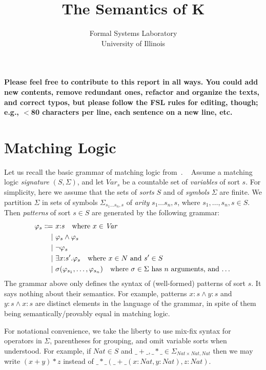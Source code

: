 \documentclass[UTF8]{article}
\title{The Semantics of K}
\author{Formal Systems Laboratory \\
          University of Illinois}
\newcommand{\comment}[1]
    {\par {\bfseries \color{blue} #1 \par}} %
\theoremstyle{plain}
\theoremstyle{definition}
\theoremstyle{remark}
\newcommand{\cln}{{:}}
\begin{document}
\maketitle

\comment{Please feel free to contribute to this report in all ways.
You could add new contents, remove redundant ones, refactor and
organize the texts, and correct typos, but please follow the FSL rules for editing, though; e.g., $<$80 characters per line,
each sentence on a new line, etc. }

\section{Matching Logic}

\newcommand{\Var}{\textit{Var}}
\newcommand{\Nat}{\textit{Nat}}

Let us recall the basic grammar of matching logic
from~\cite{rosu-2017-lmcs}.
~
Assume a matching logic \emph{signature} $(S, \Sigma)$, and
let $\Var_s$ be a countable set of
\emph{variables} of sort $s$.
For simplicity, here we assume that the sets of \emph{sorts} $S$
and of \emph{symbols} $\Sigma$ are finite.
We partition $\Sigma$ in sets of symbols
$\Sigma_{s_1 \ldots s_n, s}$ of \emph{arity} $s_1\ldots s_n,s$, where
$s_1,\ldots, s_n, s \in S$.
Then \emph{patterns} of sort $s \in S$ are generated by the following grammar:
\begin{align*}
\varphi_s \Coloneqq\  &x \cln s \quad \text{where $x \in \Var$} \\
\mid\  &\varphi_s \wedge \varphi_s \\
\mid\  &\neg \varphi_s \\
\mid\  &\exists x \cln s' . \varphi_s \quad \text{where $x \in N$ and $s' \in S$} \\
\mid\  &\sigma(\varphi_{s_1},\dots,\varphi_{s_n}) \quad \text{where $\sigma \in \Sigma$ has $n$ arguments, and \dots}
\end{align*}
The grammar above only defines the syntax of (well-formed) patterns of sort
$s$.
It says nothing about their semantics.
For example, patterns $x\cln s \wedge y \cln s$ and
$y\cln s \wedge x \cln s$ are distinct elements in the language
of the grammar, in spite of them being semantically/provably equal
in matching logic.

For notational convenience, we take the liberty to use mix-fix syntax for
operators in $\Sigma$,
parentheses for grouping, and omit variable sorts when understood.
For example, if $\Nat \in S$ and
$\_+\_, \_*\_ \in \Sigma_{\Nat \times \Nat, \Nat}$
then we may write $(x + y)*z$ instead of
$\_*\_(\_+\_(x\cln\Nat,y\cln\Nat),z\cln\Nat)$.
\end{document}
